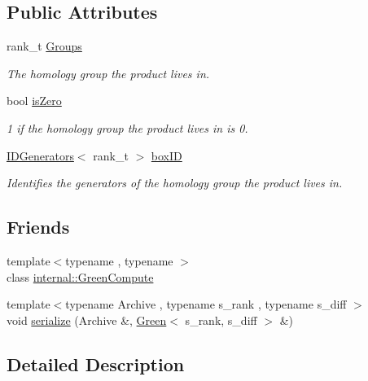 \subsection*{Public Attributes}
\begin{DoxyCompactItemize}
\item 
rank\+\_\+t \hyperlink{classMackey_1_1Green_acfa5ea708949024bd24f1c1e21399cbc}{Groups}
\begin{DoxyCompactList}\small\item\em The homology group the product lives in. \end{DoxyCompactList}\item 
bool \hyperlink{classMackey_1_1Green_a12a01a6d1715538af0bdc6b34fad6b85}{is\+Zero}
\begin{DoxyCompactList}\small\item\em 1 if the homology group the product lives in is 0. \end{DoxyCompactList}\item 
\hyperlink{classMackey_1_1IDGenerators}{I\+D\+Generators}$<$ rank\+\_\+t $>$ \hyperlink{classMackey_1_1Green_aea166896ebdaa17b3c5d21b2ae936e0d}{box\+ID}
\begin{DoxyCompactList}\small\item\em Identifies the generators of the homology group the product lives in. \end{DoxyCompactList}\end{DoxyCompactItemize}
\subsection*{Friends}
\begin{DoxyCompactItemize}
\item 
{\footnotesize template$<$typename , typename $>$ }\\class \hyperlink{classMackey_1_1Green_aa7a5b52d9d87397db413615120f34df7}{internal\+::\+Green\+Compute}
\item 
{\footnotesize template$<$typename Archive , typename s\+\_\+rank , typename s\+\_\+diff $>$ }\\void \hyperlink{classMackey_1_1Green_aeb72946219f32efa8f0a45f5f8872c8a}{serialize} (Archive \&, \hyperlink{classMackey_1_1Green}{Green}$<$ s\+\_\+rank, s\+\_\+diff $>$ \&)
\end{DoxyCompactItemize}


\subsection{Detailed Description}
